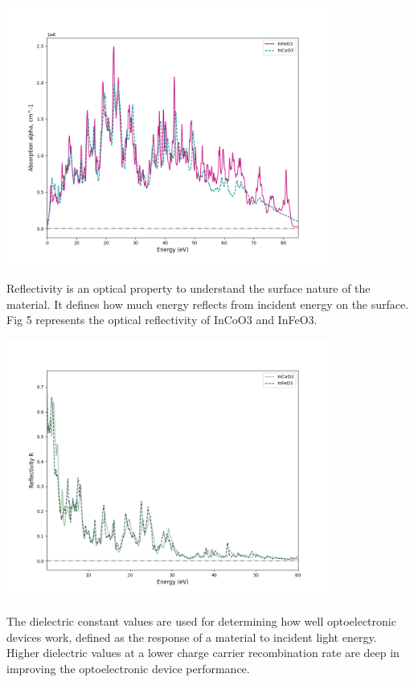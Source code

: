 \documentclass[12pt, letterpaper]{article}
\newcommand*{\1}{\hspace{1pt}}
\begin{document}
    \begin{adjustbox}{center,caption={Absorption Of InCoO3 and InFeO3},label={somelabel},nofloat=figure,vspace=\bigskipamount,}
        \includegraphics[width=0.8\textwidth]{Absorptioneng}
    \end{adjustbox}
    
    Reflectivity is an optical property to understand the surface nature of the material. It defines 
    how much energy reflects from incident energy on the surface. Fig 5 represents the optical reflectivity of InCoO3 and InFeO3. 
    
    \begin{adjustbox}{center,caption={Reflectivity Of InCoO3 and InFeO3},label={somelabel},nofloat=figure,vspace=\bigskipamount,}
        \includegraphics[width=0.8\textwidth]{refleceng}
    \end{adjustbox}
    
    The dielectric constant values are used for determining how well optoelectronic devices work, defined as the response of a material to incident light energy. Higher dielectric values at a lower 
    charge carrier recombination rate are deep in improving the optoelectronic device performance. 
\end{document}
